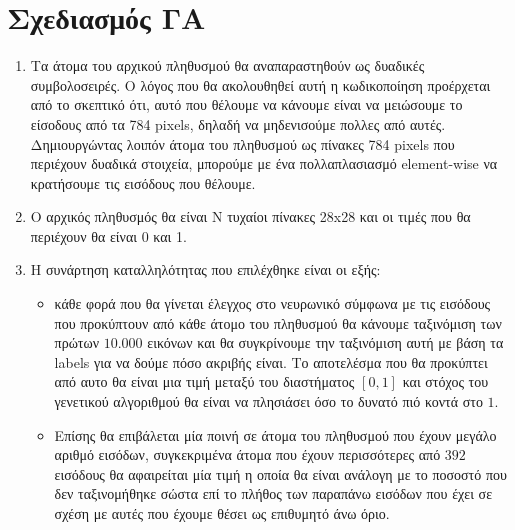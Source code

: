 \documentclass[12pt,a4paper]{article}
\newcommand{\tl}{\textlatin}
\begin{document}
        \section*{Σχεδιασμός ΓΑ}
            \begin{enumerate}
                \item Τα άτομα του αρχικού πληθυσμού θα αναπαραστηθούν ως
                    δυαδικές συμβολοσειρές. Ο λόγος που θα ακολουθηθεί αυτή η
                    κωδικοποίηση προέρχεται από το σκεπτικό ότι, αυτό που
                    θέλουμε να κάνουμε είναι να μειώσουμε το είσοδους από τα 784
                    \tl{pixels}, δηλαδή να μηδενισούμε πολλες από αυτές.
                    Δημιουργώντας λοιπόν άτομα του πληθυσμού ως πίνακες 784
                    \tl{pixels} που περιέχουν δυαδικά στοιχεία, μπορούμε με ένα
                    πολλαπλασιασμό \tl{element-wise} να κρατήσουμε τις εισόδους που
                    θέλουμε.
                \item Ο αρχικός πληθυσμός θα είναι \tl{N} τυχαίοι πίνακες
                    28\tl{x}28 και οι τιμές που θα περιέχουν θα είναι 0 και 1.
                \item Η συνάρτηση καταλληλότητας που επιλέχθηκε είναι οι εξής:
                    \begin{itemize}
                        
                        \item κάθε φορά που θα γίνεται έλεγχος στο νευρωνικό
                            σύμφωνα με τις εισόδους που προκύπτουν από κάθε
                            άτομο του πληθυσμού θα κάνουμε ταξινόμιση των πρώτων
                            $10.000$ εικόνων και θα συγκρίνουμε την ταξινόμιση
                            αυτή με βάση τα \tl{labels} για να δούμε πόσο
                            ακριβής είναι. Το αποτελέσμα που θα προκύπτει από
                            αυτο θα είναι μια τιμή μεταξύ του διαστήματος
                            $[0,1]$
                            και στόχος του γενετικού αλγοριθμού θα είναι να
                            πλησιάσει όσο το δυνατό πιό κοντά στο $1$.
                        \item Επίσης θα επιβάλεται μία ποινή σε άτομα του
                            πληθυσμού που έχουν μεγάλο αριθμό εισόδων,
                            συγκεκριμένα άτομα που έχουν περισσότερες από $392$
                            εισόδους θα αφαιρείται μία τιμή η οποία θα είναι
                            ανάλογη με το ποσοστό που δεν ταξινομήθηκε σώστα επί
                            το πλήθος των παραπάνω εισόδων που έχει σε σχέση με
                            αυτές που έχουμε θέσει ως επιθυμητό άνω όριο.


\end{itemize}
\end{enumerate}
\end{document}
